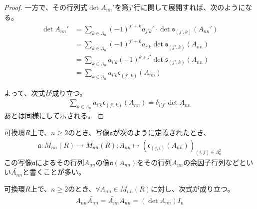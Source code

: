 \documentclass[dvipdfmx]{jsarticle}
\begin{document}
\begin{proof}
一方で、その行列式$\det A_{nn}'$を第$j'$行に関して展開すれば、次のようになる。
\begin{align*}
\det A_{nn}' &= \sum_{k \in \varLambda_{n}} {( - 1)^{j' + k}a_{j'k}' \cdot \det{\mathfrak{s}_{\left( j',k \right)}\left( A_{nn}' \right)}}\\
&= \sum_{k \in \varLambda_{n}} {( - 1)^{j' + k}a_{i'k}\det{\mathfrak{s}_{\left( j',k \right)}\left( A_{nn} \right)}}\\
&= \sum_{k \in \varLambda_{n}} {a_{i'k}( - 1)^{k + j'}\det{\mathfrak{s}_{\left( j',k \right)}\left( A_{nn} \right)}}\\
&= \sum_{k \in \varLambda_{n}} {a_{i'k}\mathfrak{c}_{\left( j',k \right)}\left( A_{nn} \right)}
\end{align*}\par
よって、次式が成り立つ。
\begin{align*}
\sum_{k \in \varLambda_{n}} {a_{i'k}\mathfrak{c}_{\left( j',k \right)}\left( A_{nn} \right)} = \delta_{i'j'}\det A_{nn}
\end{align*}
あとは同様にして示される。
\end{proof}
\begin{dfn}
可換環$R$上で、$n \geq 2$のとき、写像$\mathfrak{a}$が次のように定義されたとき、
\begin{align*}
\mathfrak{a:}M_{nn}(R) \rightarrow M_{nn}(R);A_{nn} \mapsto \left( \mathfrak{c}_{(j,i)}\left( A_{nn} \right) \right)_{(i,j) \in \varLambda_{n}^{2}}
\end{align*}
この写像$\mathfrak{a}$によるその行列$A_{nn}$の像$\mathfrak{a}\left( A_{nn} \right)$をその行列$A_{nn}$の余因子行列などといい$\widetilde{A_{nn}}$と書くことが多い。
\end{dfn}
\begin{thm}\label{2.1.11.18}
可換環$R$上で、$n \geq 2$のとき、$\forall A_{nn} \in M_{nn}(R)$に対し、次式が成り立つ。
\begin{align*}
A_{nn}\widetilde{A_{nn}} = \widetilde{A_{nn}}A_{nn} = \left( \det A_{nn} \right)I_{n}
\end{align*}
\end{thm}
\end{document}
